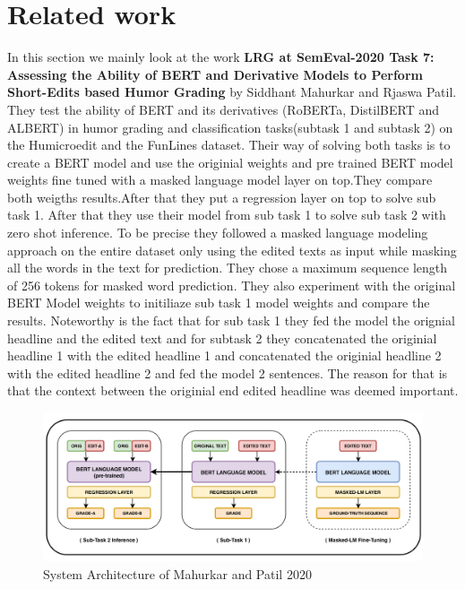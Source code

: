 \documentclass[11pt,a4paper,onecolumn,oneside,notitlepage]{article}
\begin{document}
	\section{Related work}
		In this section we mainly look at the work \textbf{LRG at SemEval-2020 Task 7: Assessing the Ability of BERT and
		Derivative Models to Perform Short-Edits based Humor Grading} by Siddhant Mahurkar and Rjaswa Patil. 
		They test the ability of BERT and its derivatives (RoBERTa, DistilBERT and ALBERT) in humor grading and classification tasks(subtask 1 and subtask 2) on the Humicroedit and the FunLines dataset.
		Their way of solving both tasks is to create a  BERT model and use the originial weights and  pre trained BERT model weights  fine tuned  with a masked language model layer on top.They compare both weigths results.After that they put a regression layer on top to solve sub task 1. After that they use their model from sub task 1 to solve sub task 2 with zero shot inference. 
		To be precise they followed a masked language modeling approach on the entire dataset only using the edited texts as input while masking all the words in the text for prediction. They chose a maximum sequence length of 256 tokens for masked word prediction. They also experiment with the original BERT Model weights to initiliaze sub task 1 model weights and compare the results.
		Noteworthy is the fact that for sub  task 1 they fed the model the orignial headline and the edited text and for subtask 2 they concatenated the originial headline 1 with the edited headline 1 and concatenated the originial headline 2 with the edited headline 2 and fed the model 2 sentences.
		The reason for that is that the context between the originial end edited headline was deemed important.
		\begin{figure}
			\begin{center}
			\includegraphics[width=1.0\linewidth]{system_architecture.png}
			\end{center}
			
			\caption{System Architecture of Mahurkar and Patil 2020}\label{fig1}
		\end{figure}
\end{document}
